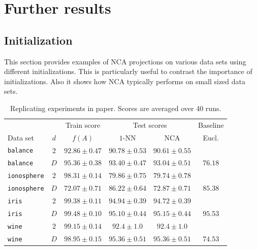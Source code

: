 \chapter{Further results}
\label{app:results}

\section{Initialization}
\label{app:sec:initialization}

This section provides examples of NCA projections on various data sets using different initializations. This is particularly useful to contrast the importance of initializations. Also it shows how NCA typically performs on small sized data sets. 


\begin{table}[h]
\centering\begin{tabular}{lccccc}
\toprule
	 &     & Train score  & \multicolumn{2}{c}{Test scores} & Baseline \\
\cmidrule(r){3-3} \cmidrule(r){4-5} \cmidrule(r){6-6}
Data set & $d$ & $f(A)$ & $1$-NN & NCA & Eucl. \\
\midrule
  \texttt{balance}&$2$&$92.86 \pm 0.47$&$90.78 \pm 0.53$&$90.61 \pm 0.55$&\\ 
  \texttt{balance}&$D$&$95.36 \pm 0.38$&$93.40 \pm 0.47$&$93.04 \pm 0.51$&$76.18$\\ 
  \texttt{ionosphere}&$2$&$98.31 \pm 0.14$&$79.86 \pm 0.75$&$79.74 \pm 0.78$&\\ 
  \texttt{ionosphere}&$D$&$72.07 \pm 0.71$&$86.22 \pm 0.64$&$72.87 \pm 0.71$&$85.38$\\ 
  \texttt{iris}&$2$&$99.38 \pm 0.11$&$94.94 \pm 0.39$&$94.72 \pm 0.39$&\\ 
  \texttt{iris}&$D$&$99.48 \pm 0.10$&$95.10 \pm 0.44$&$95.15 \pm 0.44$&$95.53$\\ 
  \texttt{wine}&$2$&$99.15 \pm 0.14$&$92.4 \pm 1.0$&$92.4 \pm 1.0$&\\ 
  \texttt{wine}&$D$&$98.95 \pm 0.15$&$95.36 \pm 0.51$&$95.36 \pm 0.51$&$74.53$\\ 
\bottomrule
\end{tabular}
\caption{Replicating experiments in paper. Scores are averaged over 40 runs.}
\end{table}

